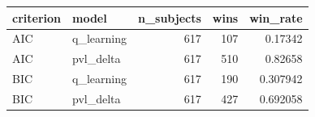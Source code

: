 \begin{tabular}{llrrr}
\toprule
criterion & model & n\_subjects & wins & win\_rate \\
\midrule
AIC & q\_learning & 617 & 107 & 0.17342 \\
AIC & pvl\_delta & 617 & 510 & 0.82658 \\
BIC & q\_learning & 617 & 190 & 0.307942 \\
BIC & pvl\_delta & 617 & 427 & 0.692058 \\
\bottomrule
\end{tabular}
